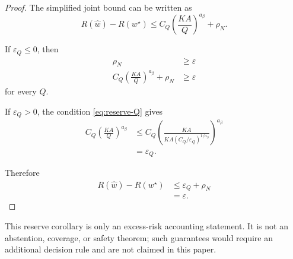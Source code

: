 \documentclass{article} %
\providecommand{\Risk}{R}
\providecommand{\what}{\widehat{w}}
\providecommand{\wstar}{w^{\star}}
\begin{document}
\begin{proof}
The simplified joint bound can be written as
\begin{equation}
\label{eq:reserve-proof-bound}
\Risk(\what)-\Risk(\wstar)
\le
C_Q\left(\frac{KA}{Q}\right)^{a_\beta}
+
\rho_N.
\end{equation}

If \(\varepsilon_Q\le 0\), then
\begin{align}
\rho_N
&\ge
\varepsilon
\label{eq:reserve-proof-impossible-a}
\\
C_Q\left(\frac{KA}{Q}\right)^{a_\beta}
+
\rho_N
&\ge
\varepsilon
\label{eq:reserve-proof-impossible-b}
\end{align}
for every \(Q\).

If \(\varepsilon_Q>0\), the condition \eqref{eq:reserve-Q} gives
\begin{align}
C_Q\left(\frac{KA}{Q}\right)^{a_\beta}
&\le
C_Q
\left(
\frac{KA}{
KA(C_Q/\varepsilon_Q)^{1/a_\beta}
}
\right)^{a_\beta}
\label{eq:reserve-proof-Q-a}
\\
&=
\varepsilon_Q.
\label{eq:reserve-proof-Q-b}
\end{align}

Therefore
\begin{align}
\Risk(\what)-\Risk(\wstar)
&\le
\varepsilon_Q+\rho_N
\label{eq:reserve-proof-final-a}
\\
&=
\varepsilon .
\label{eq:reserve-proof-final-b}
\end{align}
\end{proof}

This reserve corollary is only an excess-risk accounting statement.  It is not
an abstention, coverage, or safety theorem; such guarantees would require an
additional decision rule and are not claimed in this paper.
\end{document}
